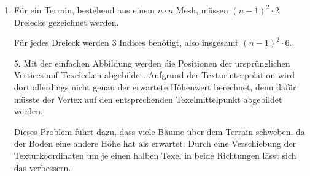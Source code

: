 \documentclass[12pt]{scrartcl}
\begin{document}
\begin{enumerate}[label=\arabic*.]
    \item Für ein Terrain, bestehend aus einem $n \cdot n$ Mesh, müssen $(n - 1)^2 \cdot 2$ Dreiecke gezeichnet werden.

          Für jedes Dreieck werden 3 Indices benötigt, also insgesamt $(n - 1)^2 \cdot 6$.
\end{enumerate}

\setcounter{exnum}{4}
\begin{enumerate}
    \item[5.] Mit der einfachen Abbildung werden die Positionen der ursprünglichen Vertices auf Texelecken abgebildet. Aufgrund der Texturinterpolation wird dort allerdings nicht genau der erwartete Höhenwert berechnet, denn dafür müsste der Vertex auf den entsprechenden Texelmittelpunkt abgebildet werden.

          Dieses Problem führt dazu, dass viele Bäume über dem Terrain schweben, da der Boden eine andere Höhe hat als erwartet. Durch eine Verschiebung der Texturkoordinaten um je einen halben Texel in beide Richtungen lässt sich das verbessern.
\end{enumerate}

\end{document}
